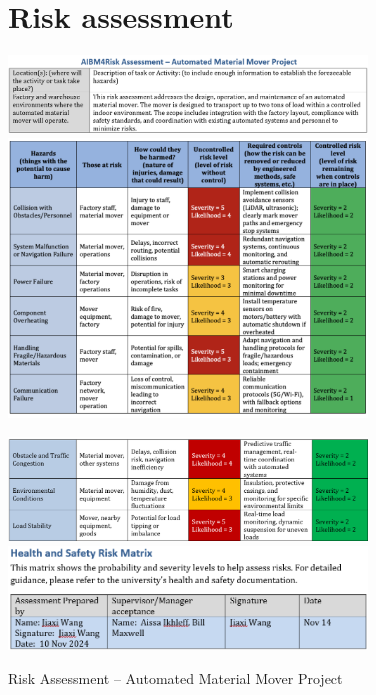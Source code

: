 \documentclass[12pt]{article}
\begin{document}
 
\begin{figure}[h!]
 \section{Risk assessment }
    \centering
    \includegraphics[width=0.85\textwidth]{Risk1.png}
    \includegraphics[width=0.85\textwidth]{Risk2.png}
\end{figure}
\begin{figure}[h!]
    \centering
    \includegraphics[width=0.85\textwidth]{Risk3.png}
    \includegraphics[width=0.85\textwidth]{Risk4.png}
    \caption{Risk Assessment – Automated Material Mover Project}
    \label{fig:risk_assessment}
\end{figure}
\FloatBarrier
\end{document}
